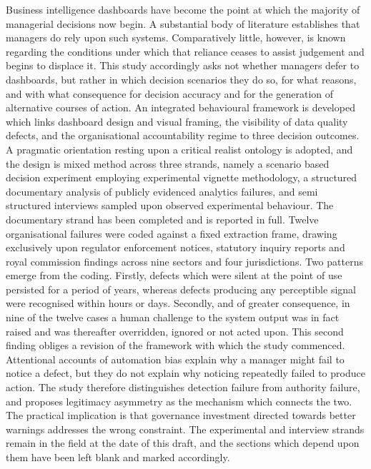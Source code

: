 \documentclass[12pt,a4paper]{article}
\begin{document}
{
Business intelligence dashboards have become the point at which the majority of managerial decisions now
begin. A substantial body of literature establishes that managers do rely upon such systems. Comparatively
little, however, is known regarding the conditions under which that reliance ceases to assist judgement and
begins to displace it. This study accordingly asks not whether managers defer to dashboards, but rather in
which decision scenarios they do so, for what reasons, and with what consequence for decision accuracy and
for the generation of alternative courses of action. An integrated behavioural framework is developed which
links dashboard design and visual framing, the visibility of data quality defects, and the organisational
accountability regime to three decision outcomes. A pragmatic orientation resting upon a critical realist
ontology is adopted, and the design is mixed method across three strands, namely a scenario based decision
experiment employing experimental vignette methodology, a structured documentary analysis of publicly
evidenced analytics failures, and semi structured interviews sampled upon observed experimental behaviour.
The documentary strand has been completed and is reported in full. Twelve organisational failures were
coded against a fixed extraction frame, drawing exclusively upon regulator enforcement notices, statutory
inquiry reports and royal commission findings across nine sectors and four jurisdictions. Two patterns
emerge from the coding. Firstly, defects which were silent at the point of use persisted for a period of
years, whereas defects producing any perceptible signal were recognised within hours or days. Secondly, and
of greater consequence, in nine of the twelve cases a human challenge to the system output was in fact
raised and was thereafter overridden, ignored or not acted upon. This second finding obliges a revision of
the framework with which the study commenced. Attentional accounts of automation bias explain why a manager
might fail to notice a defect, but they do not explain why noticing repeatedly failed to produce action.
The study therefore distinguishes detection failure from authority failure, and proposes legitimacy
asymmetry as the mechanism which connects the two. The practical implication is that governance investment
directed towards better warnings addresses the wrong constraint. The experimental and interview strands
remain in the field at the date of this draft, and the sections which depend upon them have been left blank
and marked accordingly.
\par}
\end{document}
